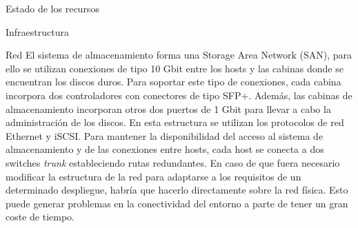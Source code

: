 \begin{chapter}{Estado de los recursos}
\begin{section}{Infraestructura}
\begin{subsection}{Red}
    El sistema de almacenamiento forma una Storage Area Network (SAN), para ello se utilizan conexiones de tipo 10 Gbit entre los hosts y las cabinas donde se encuentran los discos duros. Para soportar este tipo de conexiones, cada cabina incorpora dos controladores con conectores de tipo SFP+. Además, las cabinas de almacenamiento incorporan otros dos puertos de 1 Gbit para llevar a cabo la administración de los discos. En esta estructura se utilizan los protocolos de red Ethernet y iSCSI. Para mantener la disponibilidad del acceso al sistema de almacenamiento y de las conexiones entre hosts, cada host se conecta a dos switches \textit{trunk} estableciendo rutas redundantes.
    En caso de que fuera necesario modificar la estructura de la red para adaptarse a los requisitos de un determinado despliegue, habría que hacerlo directamente sobre la red física. Esto puede generar problemas en la conectividad del entorno a parte de tener un gran coste de tiempo.
\end{subsection}

\end{section}


\end{chapter}
